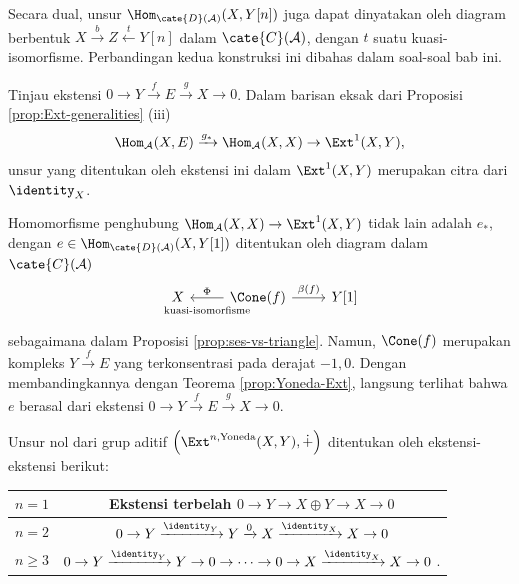 Secara dual, unsur $\Hom_{\cate{D}(\mathcal{A})}(X, Y[n])$ juga dapat
dinyatakan oleh diagram berbentuk
$X \xrightarrow{b} Z \xleftarrow{t} Y[n]$ dalam $\cate{C}(\mathcal{A})$,
dengan $t$ suatu kuasi-isomorfisme. Perbandingan kedua konstruksi ini dibahas
dalam soal-soal bab ini.

\begin{proposisi}\label{prop:Ext1-via-ses}
	Tinjau ekstensi
	$0 \to Y \xrightarrow{f} E \xrightarrow{g} X \to 0$. Dalam barisan eksak
	dari Proposisi \ref{prop:Ext-generalities} (iii)
	\begin{gather*}
		\Hom_{\mathcal{A}}(X, E) \xrightarrow{g_*} \Hom_{\mathcal{A}}(X, X) \to \Ext^1(X, Y),
	\end{gather*}
	unsur yang ditentukan oleh ekstensi ini dalam $\Ext^1(X, Y)$ merupakan citra dari
	$\identity_X$.
\end{proposisi}

\begin{bukti}
	Homomorfisme penghubung
	$\Hom_{\mathcal{A}}(X, X) \to \Ext^1(X, Y)$ tidak lain adalah $e_*$,
	dengan $e \in \Hom_{\cate{D}(\mathcal{A})}(X, Y[1])$ ditentukan oleh
	diagram dalam $\cate{C}(\mathcal{A})$
	\[\begin{tikzcd}
		X & \Cone(f) \arrow[r, "{\beta(f)}"] \arrow[l, "\Phi"', "\text{kuasi-isomorfisme}" inner sep=0.6em] & {Y[1]}
	\end{tikzcd}\]
	sebagaimana dalam Proposisi \ref{prop:ses-vs-triangle}. Namun, $\Cone(f)$
	merupakan kompleks $Y \xrightarrow{f} E$ yang terkonsentrasi pada derajat $-1,0$.
	Dengan membandingkannya dengan Teorema \ref{prop:Yoneda-Ext}, langsung
	terlihat bahwa $e$ berasal dari ekstensi
	$0 \to Y \xrightarrow{f} E \xrightarrow{g} X \to 0$.
\end{bukti}

\begin{proposisi}\label{prop:Yoneda-zero}
	Unsur nol dari grup aditif
	$\left(\Ext^{n, \text{Yoneda}}(X, Y), \dot{+} \right)$ ditentukan oleh
	ekstensi-ekstensi berikut:
	\begin{center}\begin{tabular}{|c|c|} \hline
		$n = 1$ & Ekstensi terbelah $0 \to Y \to X \oplus Y \to X \to 0$ \\ \hline
		$n = 2$ & $0 \to Y \xrightarrow{\identity_Y} Y \xrightarrow{0} X \xrightarrow{\identity_X} X \to 0$ \\ \hline
		$n \geq 3$ & $0 \to Y \xrightarrow{\identity_Y} Y \to 0 \to \cdots \to 0 \to X \xrightarrow{\identity_X} X \to 0$ . \\ \hline
	\end{tabular}\end{center}
\end{proposisi}

